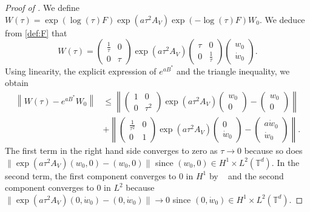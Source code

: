 \documentclass[a4paper]{article}
\theoremstyle{plain}
\newcommand{\T}{\mathbb{T}}
\begin{document}
\begin{proof}[Proof of ]
We define $W(\tau)=\exp(\log(\tau)F) \exp( a \tau^2 A_V) \exp(-\log(\tau)F)W_0$.
We deduce from \eqref{def:F} that
$$W(\tau)
 =\begin{pmatrix}
\frac{1}{\tau} & 0 \\ 0 & \tau
\end{pmatrix}
\exp( a \tau^2 A_V) 
\begin{pmatrix}
\tau & 0 \\ 0 & \frac{1}{\tau}
\end{pmatrix}
\begin{pmatrix}
w_0 \\ \dot{w}_0
\end{pmatrix}.$$
Using linearity, the explicit expression of $e^{aB^*}$ and the triangle inequality, we obtain
$$\begin{aligned}
\left\| W(\tau)-e^{aB^*}W_0 \right\|
& \leq 
\left\| \begin{pmatrix}
1 & 0 \\ 0 & \tau^2
\end{pmatrix}
\exp( a \tau^2 A_V) 
\begin{pmatrix}
w_0 \\ 0
\end{pmatrix} - 
\begin{pmatrix}
w_0 \\ 0
\end{pmatrix}
\right\| 
\\ & +  
\left\| 
\begin{pmatrix}
\frac{1}{\tau^2} & 0 \\ 0 & 1
\end{pmatrix}
\exp( a \tau^2 A_V) 
\begin{pmatrix}
0 \\ \dot{w}_0
\end{pmatrix}
- 
\begin{pmatrix}
a \dot{w}_0 \\ \dot{w}_0
\end{pmatrix}
\right\|.
\end{aligned}$$
The first term in the right hand side converges to zero as $\tau \to 0$ because so does\newline$\| \exp(a\tau^2 A_V)(w_0,0) - (w_0,0)\|$ since $(w_0,0) \in H^1 \times L^2(\T^d)$. In the second term, the first component converges to $0$ in $H^1$ by \  and the second component converges to $0$ in $L^2$ because
$\|\exp(a\tau^2 A_V)(0,\dot{w}_0) - (0,\dot{w}_0)\| \to 0$ since $(0,\dot{w}_0) \in H^1 \times L^2(\T^d)$.
\end{proof}
\end{document}

